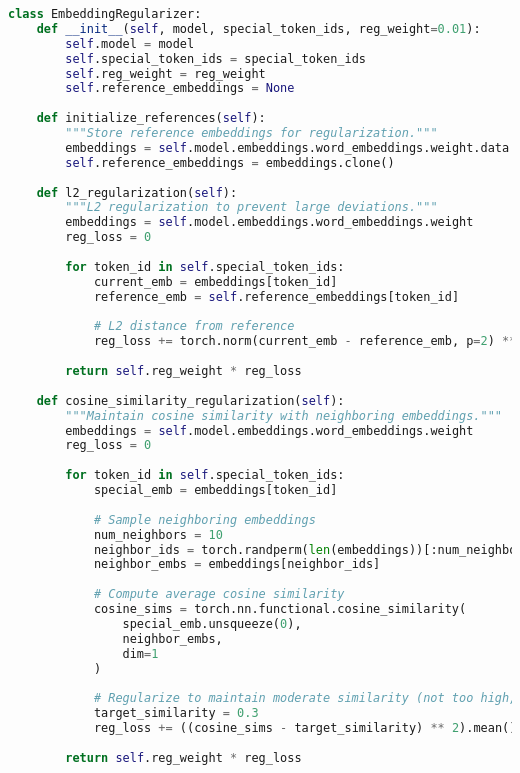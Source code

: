 \begin{lstlisting}[language=Python, caption=Regularization techniques for special token embeddings]
class EmbeddingRegularizer:
    def __init__(self, model, special_token_ids, reg_weight=0.01):
        self.model = model
        self.special_token_ids = special_token_ids
        self.reg_weight = reg_weight
        self.reference_embeddings = None
        
    def initialize_references(self):
        """Store reference embeddings for regularization."""
        embeddings = self.model.embeddings.word_embeddings.weight.data
        self.reference_embeddings = embeddings.clone()
        
    def l2_regularization(self):
        """L2 regularization to prevent large deviations."""
        embeddings = self.model.embeddings.word_embeddings.weight
        reg_loss = 0
        
        for token_id in self.special_token_ids:
            current_emb = embeddings[token_id]
            reference_emb = self.reference_embeddings[token_id]
            
            # L2 distance from reference
            reg_loss += torch.norm(current_emb - reference_emb, p=2) ** 2
            
        return self.reg_weight * reg_loss
        
    def cosine_similarity_regularization(self):
        """Maintain cosine similarity with neighboring embeddings."""
        embeddings = self.model.embeddings.word_embeddings.weight
        reg_loss = 0
        
        for token_id in self.special_token_ids:
            special_emb = embeddings[token_id]
            
            # Sample neighboring embeddings
            num_neighbors = 10
            neighbor_ids = torch.randperm(len(embeddings))[:num_neighbors]
            neighbor_embs = embeddings[neighbor_ids]
            
            # Compute average cosine similarity
            cosine_sims = torch.nn.functional.cosine_similarity(
                special_emb.unsqueeze(0),
                neighbor_embs,
                dim=1
            )
            
            # Regularize to maintain moderate similarity (not too high, not too low)
            target_similarity = 0.3
            reg_loss += ((cosine_sims - target_similarity) ** 2).mean()
            
        return self.reg_weight * reg_loss
        

\end{lstlisting}
